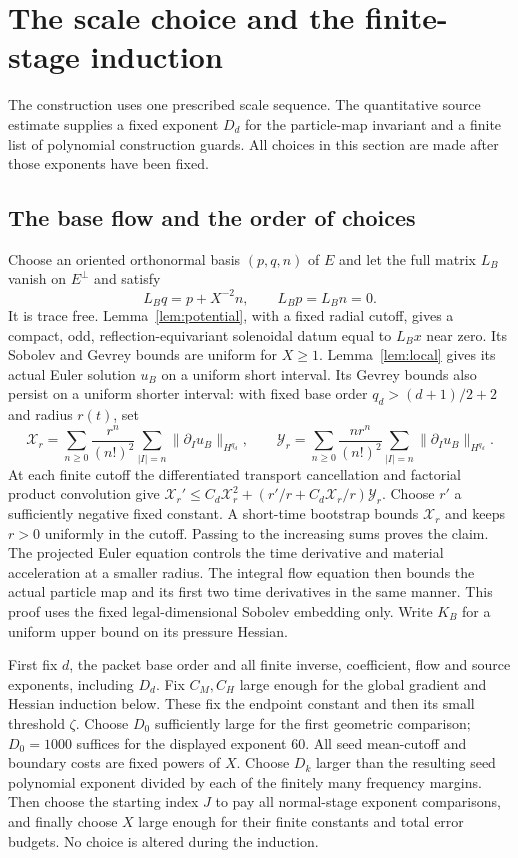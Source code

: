 \section{The scale choice and the finite-stage induction}
\label{sec:iteration}
The construction uses one prescribed scale sequence. The quantitative source estimate supplies a fixed exponent $D_d$
for the particle-map invariant and a finite list of polynomial construction
guards. All choices in this section are made after those exponents have
been fixed.

\subsection{The base flow and the order of choices}
Choose an oriented orthonormal basis $(p,q,n)$ of $E$ and let the full
matrix $L_B$ vanish on $E^\perp$ and satisfy
\[
 L_Bq=p+X^{-2}n,\qquad L_Bp=L_Bn=0.
\]
It is trace free. Lemma~\ref{lem:potential}, with a fixed radial cutoff,
gives a compact, odd, reflection-equivariant solenoidal datum equal to
$L_Bx$ near zero. Its Sobolev and Gevrey bounds are uniform for $X\geq1$.
Lemma~\ref{lem:local} gives its actual Euler solution $u_B$ on a uniform
short interval. Its Gevrey bounds also persist on a uniform shorter
interval: with fixed base order $q_d> (d+1)/2+2$ and radius $r(t)$,
set
\[
 \mathcal X_r=\sum_{n\geq0}\frac{r^n}{(n!)^2}
                  \sum_{|I|=n}\|\partial_Iu_B\|_{H^{q_d}},
 \qquad
 \mathcal Y_r=\sum_{n\geq0}\frac{nr^n}{(n!)^2}
                  \sum_{|I|=n}\|\partial_Iu_B\|_{H^{q_d}}.
\]
At each finite cutoff the differentiated transport cancellation and
factorial product convolution give
$\mathcal X_r'\leq C_d\mathcal X_r^2+
(r'/r+C_d\mathcal X_r/r)\mathcal Y_r$.
Choose $r'$ a sufficiently negative fixed constant. A short-time
bootstrap bounds $\mathcal X_r$ and keeps $r>0$ uniformly in the
cutoff. Passing to the increasing sums proves the claim. The projected
Euler equation controls the time derivative and material acceleration
at a smaller radius. The integral flow equation then bounds the actual
particle map and its first two time derivatives in the same manner.
This proof uses the fixed legal-dimensional Sobolev embedding only.
Write $K_B$ for a uniform upper bound on its pressure Hessian.

First fix $d$, the packet base order and all finite inverse, coefficient,
flow and source exponents, including $D_d$. Fix $C_M,C_H$ large enough
for the global gradient and Hessian induction below. These fix the
endpoint constant and then its small threshold $\zeta$.
Choose $D_0$ sufficiently large for the first geometric comparison;
$D_0=1000$ suffices for the displayed exponent $60$.
All seed mean-cutoff and boundary costs are fixed powers of $X$.
Choose $D_k$ larger than the resulting seed polynomial exponent divided
by each of the finitely many frequency margins. Then choose the starting
index $J$ to pay all normal-stage exponent comparisons, and finally
choose $X$ large enough for their finite constants and total error budgets.
No choice is altered during the induction.

